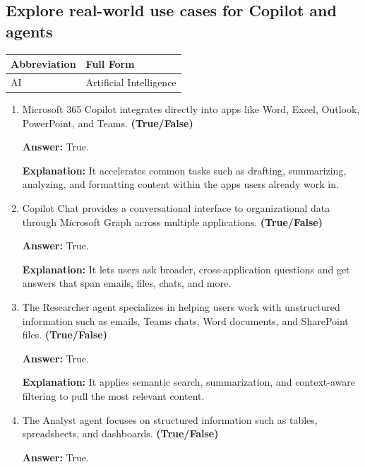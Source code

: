 \documentclass[10pt]{article}
\begin{document}
\subsection{Explore real-world use cases for Copilot and agents}

\begin{center}
\begin{tabular}{>{\raggedright\arraybackslash}p{} >{\raggedright\arraybackslash}p{}}
\toprule
\textbf{Abbreviation} & \textbf{Full Form} \\
\midrule
AI & Artificial Intelligence \\
\end{tabular}
\end{center}

\begin{enumerate}[leftmargin=*]

\item Microsoft 365 Copilot integrates directly into apps like Word, Excel, Outlook, PowerPoint, and Teams. \textbf{(True/False)}

\textbf{Answer:} True.

\textbf{Explanation:} It accelerates common tasks such as drafting, summarizing, analyzing, and formatting content within the apps users already work in.

\item Copilot Chat provides a conversational interface to organizational data through Microsoft Graph across multiple applications. \textbf{(True/False)}

\textbf{Answer:} True.

\textbf{Explanation:} It lets users ask broader, cross-application questions and get answers that span emails, files, chats, and more.

\item The Researcher agent specializes in helping users work with unstructured information such as emails, Teams chats, Word documents, and SharePoint files. \textbf{(True/False)}

\textbf{Answer:} True.

\textbf{Explanation:} It applies semantic search, summarization, and context-aware filtering to pull the most relevant content.

\item The Analyst agent focuses on structured information such as tables, spreadsheets, and dashboards. \textbf{(True/False)}

\textbf{Answer:} True.


\end{enumerate}
\end{document}
